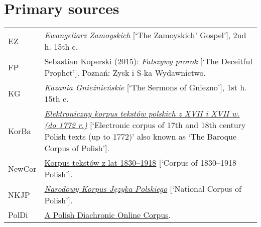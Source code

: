 \documentclass[output=paper
,modfonts
,nonflat]{langsci/langscibook}
\begin{document}
\section*{Primary sources}

\noindent\begin{tabularx}{\textwidth}{@{}lX@{}}
	EZ & \emph{Ewangeliarz Zamoyskich} [`The Zamoyskich' Gospel'], 2nd h. 15th c. \\
	FP & Sebastian Koperski (2015): \emph{Fałszywy prorok} [`The Deceitful Prophet']. Poznań: Zysk i S-ka Wydawnictwo. \\
	KG &  \emph{Kazania Gnieźnieńskie} [`The Sermons of Gniezno'], 1st h. 15th c. \\
	KorBa & \href{http://korba.edu.pl/query_corpus/} {\emph{Elektroniczny korpus tekstów polskich z XVII i XVII w. (do 1772 r.)}} [`Electronic corpus of 17th and 18th century Polish texts (up to 1772)' also known as `The Baroque Corpus of Polish']. \\
	NewCor & \href{https://szukajwslownikach.uw.edu.pl/f19/} {Korpus tekstów z lat 1830--1918} [`Corpus of 1830--1918 Polish']. \\
  	NKJP & \href{http://nkjp.pl/} {\emph{Narodowy Korpus Języka Polskiego}} [`National Corpus of Polish']. \\
	PolDi & \href{http://rhssl1.uni-regensburg.de/SlavKo/korpus/poldi} {A Polish Diachronic Online Corpus}. \\
\end{tabularx}
\end{document}
